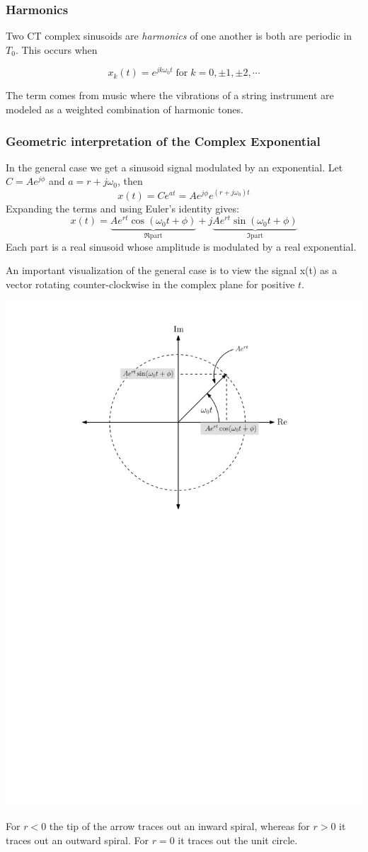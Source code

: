 \subsubsection{Harmonics}

Two CT complex sinusoids are {\it harmonics} of one another is both are periodic in $T_0$. This occurs when

\[
    x_k(t) = e^{jk\omega_0 t} \; \text{for} \; k = 0, \pm 1, \pm 2, \cdots
\]

The term comes from music where the vibrations of a string instrument are modeled as a weighted combination of harmonic tones. 

\subsubsection{Geometric interpretation of the Complex Exponential}

In the general case we get a sinusoid signal modulated by an exponential. Let $C = Ae^{j\phi}$ and $a = r + j\omega_0$, then
\[
  x(t) = C e^{a t} =  Ae^{j\phi} e^{(r+j\omega_0)t}
\]
Expanding the terms and using Euler's identity gives:
\[
x(t) = \underbrace{Ae^{rt}\cos(\omega_0 t+\phi)}_{\Re \text{part}} + j \underbrace{Ae^{rt}\sin(\omega_0 t+\phi)}_{\Im \text{part}}
\]
Each part is a real sinusoid whose amplitude is modulated by a real exponential.

An important visualization of the general case is to view the signal x(t) as a vector rotating counter-clockwise in the complex plane for positive $t$.

\begin{center}
 \includegraphics[scale=0.7]{graphics/CT_complexsinusoid_visual}
\end{center}

For $r < 0$ the tip of the arrow traces out an inward spiral, whereas for $r > 0$ it traces out an outward spiral. For $r = 0$ it traces out the unit circle.
